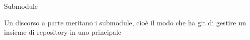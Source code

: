 \capitolo Submodule

Un discorso a parte meritano i submodule, cio\`e il modo che ha git di gestire
un insieme di repository in uno principale
